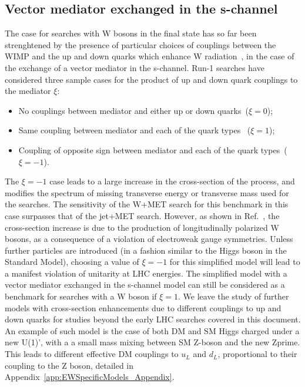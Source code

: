 
\subsection{Vector mediator exchanged in the s-channel}

The case for searches with W bosons in the final state has so far been strenghtened by the
presence of particular choices of couplings between the WIMP and the up and
down quarks which enhance W radiation~\cite{Bai:2012xg}, in the case of the exchange
of a vector mediator in the s-channel.
Run-1 searches have considered three sample cases for the product of
up and down quark couplings to the mediator $\xi$:
\begin{itemize}
 \item No couplings between mediator and either up or down quarks~($\xi=0$);
 \item Same coupling between mediator and each of the quark types~ ($\xi=1$);
 \item Coupling of opposite sign between mediator and each of the quark types~($\xi=-1$).
\end{itemize}
The $\xi=-1$ case leads to a large increase in the cross-section of the process,
and modifies the spectrum of missing transverse energy or
transverse mass used for the searches. The sensitivity of the W+MET search for
this benchmark in this case surpasses that of the jet+MET search.
However, as shown in Ref.~\cite{Bell:2015sza}, the cross-section increase is due
to the production of longitudinally polarized W bosons,
as a consequence of a violation of electroweak gauge symmetries. Unless further
particles are introduced (in a fashion similar
to the Higgs boson in the Standard Model), choosing a value of $\xi=-1$
for this simplified model will lead to a manifest violation of unitarity at LHC energies.
The simplified model with a vector mediator exchanged in the s-channel model
can still be considered as a benchmark for searches with a W boson if $\xi=1$.
We leave the study of further models with cross-section enhancements due
to different couplings to up and down quarks for studies beyond the early LHC searches
covered in this document.
An example of such model is the case of both DM and SM Higgs charged under a new U(1)',
with a a small mass mixing between SM Z-boson and the new Zprime. This leads
to different effective DM couplings to $u_L$ and $d_L$, proportional to
their coupling to the Z boson, detailed in Appendix~\ref{app:EWSpecificModels_Appendix}.

